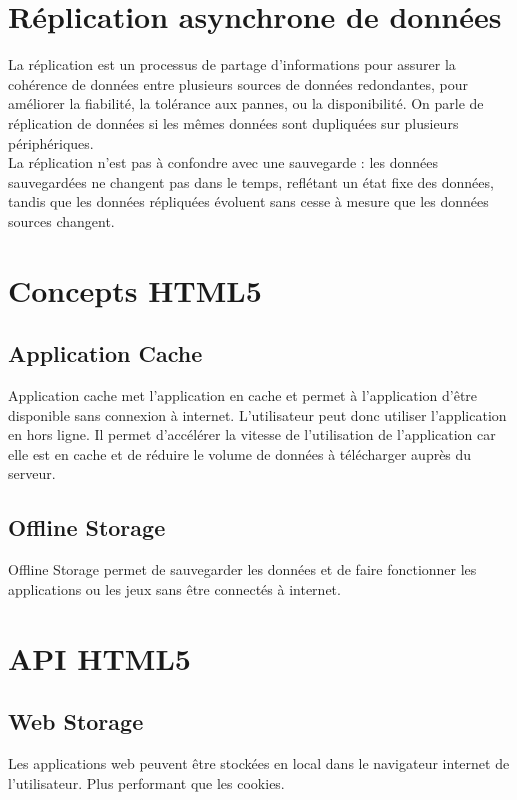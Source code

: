 \section{Réplication asynchrone de données}

	La réplication est un processus de partage d'informations pour assurer la cohérence de données entre plusieurs sources de données redondantes, pour améliorer la fiabilité, la tolérance aux pannes, ou la disponibilité. On parle de réplication de données si les mêmes données sont dupliquées sur plusieurs périphériques.\\

	La réplication n'est pas à confondre avec une sauvegarde : les données sauvegardées ne changent pas dans le temps, reflétant un état fixe des données, tandis que les données répliquées évoluent sans cesse à mesure que les données sources changent. 

\section{Concepts HTML5}

	\subsection{Application Cache}
		Application cache met l’application en cache et permet à l’application d’être disponible sans connexion à internet. L’utilisateur peut donc utiliser l’application en hors ligne. Il permet d’accélérer la vitesse de l’utilisation de l’application car elle est en cache et de réduire le volume de données à télécharger auprès du serveur.

	\subsection{Offline Storage} 
		Offline Storage permet de sauvegarder les données et de faire fonctionner les applications ou les jeux sans être connectés à internet.

\section{API HTML5}
	
	\subsection{Web Storage}
		Les applications web peuvent être stockées en local dans le navigateur internet de l’utilisateur. Plus performant que les cookies.

